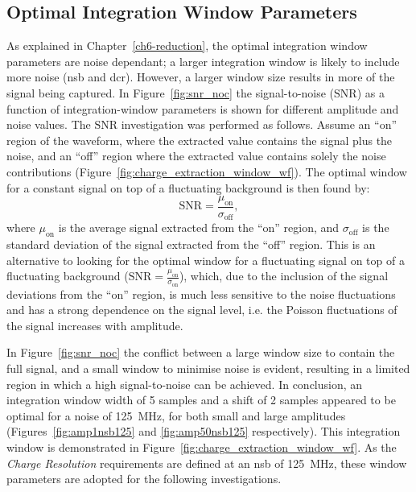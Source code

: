 \subsection{Optimal Integration Window Parameters}

As explained in Chapter~\ref{ch6-reduction}, the optimal integration window parameters are noise dependant; a larger integration window is likely to include more noise (\gls{nsb} and \gls{dcr}). However, a larger window size results in more of the signal being captured. In Figure~\ref{fig:snr_noc} the signal-to-noise ($\text{SNR}$) as a function of integration-window parameters is shown for different amplitude and noise values. The $\text{SNR}$ investigation was performed as follows. Assume an ``on'' region of the waveform, where the extracted value contains the signal plus the noise, and an ``off'' region where the extracted value contains solely the noise contributions (Figure~\ref{fig:charge_extraction_window_wf}). The optimal window for a constant signal on top of a fluctuating background is then found by:
\begin{equation}
\text{SNR} = \frac{\mu_\text{on}}{\sigma_\text{off}},
\end{equation}
where $\mu_\text{on}$ is the average signal extracted from the ``on'' region, and $\sigma_\text{off}$ is the standard deviation of the signal extracted from the ``off'' region. This is an alternative to looking for the optimal window for a fluctuating signal on top of a fluctuating background ($\text{SNR} = \frac{\mu_\text{on}}{\sigma_\text{on}}$), which, due to the inclusion of the signal deviations from the ``on'' region, is much less sensitive to the noise fluctuations and has a strong dependence on the signal level, i.e. the Poisson fluctuations of the signal increases with amplitude.

In Figure~\ref{fig:snr_noc} the conflict between a large window size to contain the full signal, and a small window to minimise noise is evident, resulting in a limited region in which a high signal-to-noise can be achieved. In conclusion, an integration window width of 5 samples and a shift of 2 samples appeared to be optimal for a noise of \SI{125}{MHz}, for both small and large amplitudes (Figures~\ref{fig:amp1nsb125} and \ref{fig:amp50nsb125} respectively). This integration window is demonstrated in Figure~\ref{fig:charge_extraction_window_wf}. As the \textit{Charge Resolution} requirements are defined at an \gls{nsb} of \SI{125}{MHz}, these window parameters are adopted for the following investigations.


